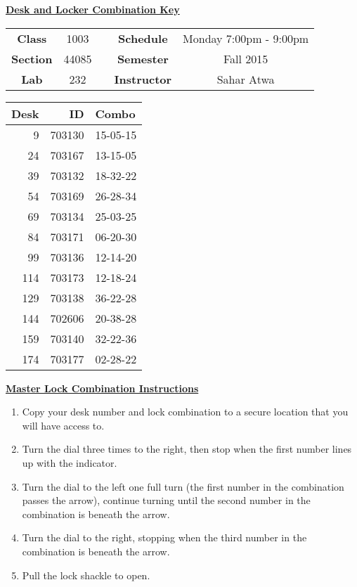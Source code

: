 \documentclass[12pt]{article}
\begin{document}
\thispagestyle{empty}

\begin{center}
	{\huge\textbf{\underline{ Desk and Locker Combination Key}}}
\end{center}


\begin{table}[h]
  \centering
  \begin{tabular}{ccccc}

  \textbf{Class} & 1003 & {\qquad} &\textbf{Schedule} & Monday 7:00pm - 9:00pm \\
  \textbf{Section} & 44085 & {\qquad} & \textbf{Semester} & Fall 2015 \\
  \textbf{Lab} & 232 & {\qquad} & \textbf{Instructor} & Sahar Atwa \\
  \end{tabular}
\end{table}
 \vspace{0.5in}
\begin{minipage}{0.4\textwidth}

\begin{tabular}{rrl}
\toprule
 Desk &      ID &     Combo \\
\midrule
    9 &  703130 &  15-05-15 \\
   24 &  703167 &  13-15-05 \\
   39 &  703132 &  18-32-22 \\
   54 &  703169 &  26-28-34 \\
   69 &  703134 &  25-03-25 \\
   84 &  703171 &  06-20-30 \\
   99 &  703136 &  12-14-20 \\
  114 &  703173 &  12-18-24 \\
  129 &  703138 &  36-22-28 \\
  144 &  702606 &  20-38-28 \\
  159 &  703140 &  32-22-36 \\
  174 &  703177 &  02-28-22 \\
\bottomrule
\end{tabular}


\end{minipage}
\begin{minipage}{0.4\textwidth}
\underline{{\large \textbf{Master Lock Combination Instructions}}}
\begin{enumerate}
\item Copy your desk number and lock combination to a secure location that you will have access to.
\item Turn the dial three times to the right, then stop when the first number lines up with the indicator.
\item Turn the dial to the left one full turn (the first number in the combination passes the arrow), continue turning until the second number in the combination is beneath the arrow.
\item Turn the dial to the right, stopping when the third number in the combination is beneath the arrow.
\item Pull the lock shackle to open.
\end{enumerate}
\end{minipage}
\end{document}
